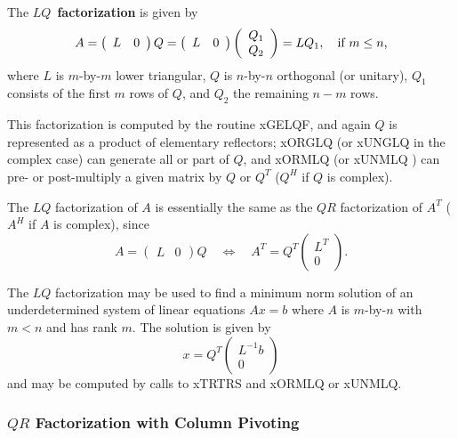 The {\boldmath $LQ$}~{\bf factorization}
is given by
\[
A = \left( \begin{array}{cc} L & 0 \end{array}\right) Q
  = \left( \begin{array}{cc} L & 0 \end{array}\right)
    \left( \begin{array}{c} Q_1 \\ Q_2 \end{array} \right)
  = L Q_1, \quad \mbox{if $ m \le n$,}
\]
where $L$ is $m$-by-$m$ lower triangular, $Q$ is $n$-by-$n$
orthogonal (or unitary), $Q_1$ consists of the first $m$ rows of $Q$,
and $Q_2$ the remaining $n-m$ rows.

This factorization is computed by the routine xGELQF, and again $Q$ is
represented as a product of elementary reflectors; xORGLQ
(or xUNGLQ in the complex case) can generate
all or part of $Q$, and xORMLQ (or xUNMLQ
) can pre- or post-multiply a given
matrix
by $Q$ or $Q^T$ ($Q^H$ if $Q$ is complex).

The $LQ$ factorization of $A$ is essentially the same as the $QR$ factorization
of $A^T$ ($A^H$ if $A$ is complex), since
\[
A = \left( \begin{array}{cc} L & 0 \end{array}\right) Q
\quad \Longleftrightarrow
\quad
A^T = Q^T \left( \begin{array}{c} L^T \\0\end{array}\right) .
\]

The $LQ$ factorization may be used to find a minimum norm solution of
an underdetermined system of linear equations $A x = b$ where $A$ is
$m$-by-$n$ with $m < n$ and has rank $m$. The solution is given by
\[
x = Q^T \left( \begin{array}{c} L^{-1} b \\ 0 \end{array} \right)
\]
and may be computed by calls to xTRTRS
and xORMLQ or xUNMLQ.

\subsubsection{$QR$ Factorization with Column Pivoting}

